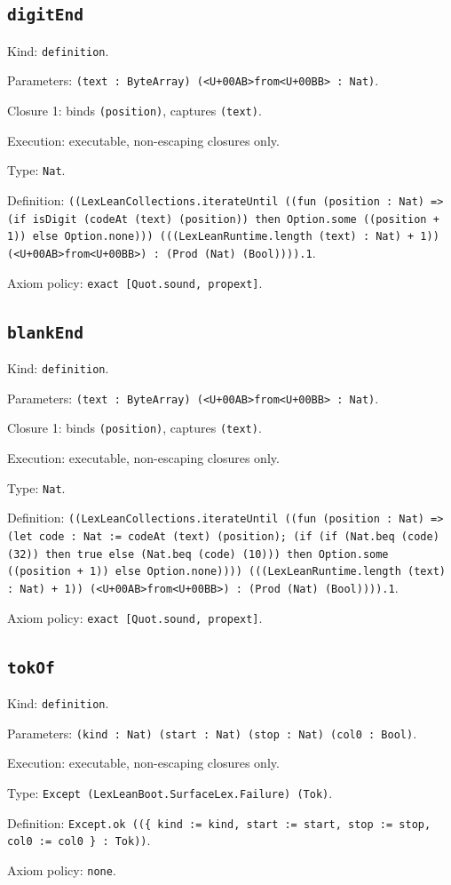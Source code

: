 \documentclass[11pt]{article}
\begin{document}
\subsection*{\texttt{digitEnd}}
\noindent Kind: \texttt{definition}.\par
\noindent Parameters: \texttt{(text : ByteArray) (<U+00AB>from<U+00BB> : Nat)}.\par
\noindent Closure 1: binds \texttt{(position)}, captures \texttt{(text)}.\par
\noindent Execution: executable, non-escaping closures only.\par
\noindent Type: \texttt{Nat}.\par
\noindent Definition: \texttt{((LexLeanCollections.iterateUntil ((fun (position : Nat) => (if isDigit (codeAt (text) (position)) then Option.some ((position + 1)) else Option.none))) (((LexLeanRuntime.length (text) : Nat) + 1)) (<U+00AB>from<U+00BB>) : (Prod (Nat) (Bool)))).1}.\par
\noindent Axiom policy: \texttt{exact [Quot.sound, propext]}.\par
\subsection*{\texttt{blankEnd}}
\noindent Kind: \texttt{definition}.\par
\noindent Parameters: \texttt{(text : ByteArray) (<U+00AB>from<U+00BB> : Nat)}.\par
\noindent Closure 1: binds \texttt{(position)}, captures \texttt{(text)}.\par
\noindent Execution: executable, non-escaping closures only.\par
\noindent Type: \texttt{Nat}.\par
\noindent Definition: \texttt{((LexLeanCollections.iterateUntil ((fun (position : Nat) => (let code : Nat := codeAt (text) (position); (if (if (Nat.beq (code) (32)) then true else (Nat.beq (code) (10))) then Option.some ((position + 1)) else Option.none)))) (((LexLeanRuntime.length (text) : Nat) + 1)) (<U+00AB>from<U+00BB>) : (Prod (Nat) (Bool)))).1}.\par
\noindent Axiom policy: \texttt{exact [Quot.sound, propext]}.\par
\subsection*{\texttt{tokOf}}
\noindent Kind: \texttt{definition}.\par
\noindent Parameters: \texttt{(kind : Nat) (start : Nat) (stop : Nat) (col0 : Bool)}.\par
\noindent Execution: executable, non-escaping closures only.\par
\noindent Type: \texttt{Except (LexLeanBoot.SurfaceLex.Failure) (Tok)}.\par
\noindent Definition: \texttt{Except.ok ((\{ kind := kind, start := start, stop := stop, col0 := col0 \} : Tok))}.\par
\noindent Axiom policy: \texttt{none}.\par
\end{document}
